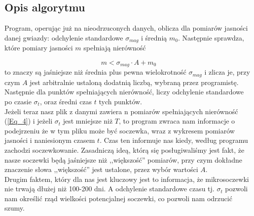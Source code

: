 \documentclass[a4paper,11pt]{article}
\newcommand{\ak}{\hspace{0.7 cm}}
\begin{document}
\subsection{Opis algorytmu}
\ak Program, operując już na nieodrzuconych danych, oblicza dla pomiarów jasności danej gwiazdy: odchylenie standardowe  $\sigma_{mag}$ i średnią $m_0$. Następnie  sprawdza, które pomiary jasności $m$ spełniają nierówność

\begin{equation}
m<\sigma_{mag}\cdot A+m_0 
\label{Eq_4}
\end{equation}
to znaczy są jaśniejsze niż średnia plus pewna wielokrotność $\sigma_{mag}$ i zlicza je, przy czym $A$ jest arbitralnie ustaloną dodatnią liczbą, wybraną przez programistę. Następnie dla punktów spełniających nierówność, liczy odchylenie standardowe po czasie $\sigma_t$, oraz średni czas $t$ tych punktów.\\
\ak Jeżeli teraz nasz plik z danymi zawiera n pomiarów spełniających nierówność (\ref{Eq_4})  i jeżeli $\sigma_t$ jest mniejsze niż $T$, to program zwraca nam informacje o podejrzeniu że w tym pliku może być soczewka, wraz z wykresem pomiarów jasności i naniesionym czasem $t$. Czas ten informuje nas kiedy, według programu zachodzi soczewkowanie.
\ak Zasadniczą ideą, którą się posługiwaliśmy jest fakt, że nasze soczewki będą jaśniejsze niż ,,większość'' pomiarów, przy czym dokładne znaczenie słowa ,,większość'' jest ustalone, przez wybór wartości $A$.
\\ 
\ak Drugim faktem, który dla nas jest kluczowy jest to informacja, że mikrosoczewki nie trwają dłużej niż 100-200 dni. A odchylenie standardowe czasu tj. $\sigma_t$ pozwoli nam określić rząd wielkości potencjalnej soczewki, co pozwoli nam odrzucić szumy.
\\
\end{document}
